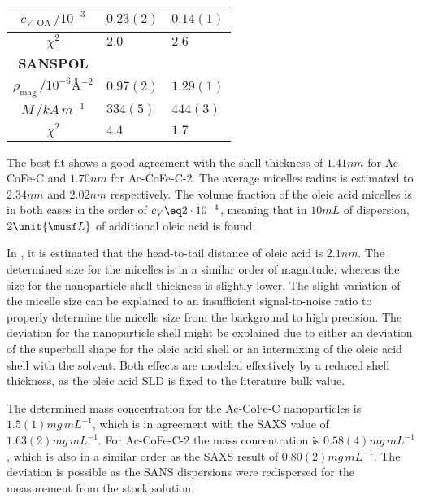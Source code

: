 \documentclass[\main/dresen_thesis.tex]{subfiles}
\begin{document}
\begin{table}[!htbp]
\begin{tabular}{ c | l | l }
        \rule{0pt}{2ex} $c_{V, \, \mathrm{OA}} \, / \unit{10^{-3}}$                  & $0.23(2)$      & $0.14(1)$  \\
        \hline
        \rule{0pt}{2ex} $\chi^2$                                                     & $2.0$          & $2.6$      \\
        \hline
        \textbf{SANSPOL}\\
        \hline
        \rule{0pt}{2ex} $\rho_\mathrm{mag} \, / \unit{10^{-6} \angstrom^{-2}}$       & $0.97(2)$      & $1.29(1)$  \\
        \rule{0pt}{2ex} $M \, / \unit{kA \,m^{-1}}$                                  & $334(5)$       & $444(3)$   \\
        \hline
        \rule{0pt}{2ex} $\chi^2$                                                     & $4.4$          & $1.7$      \\
      \end{tabular}
    \end{table}

    The best fit shows a good agreement with the shell thickness of $1.41 \unit{nm}$ for Ac-CoFe-C and $1.70 \unit{nm}$ for Ac-CoFe-C-2.
    The average micelles radius is estimated to $2.34 \unit{nm}$ and $2.02 \unit{nm}$ respectively.
    The volume fraction of the oleic acid micelles is in both cases in the order of $c_V \eq 2 \cdot 10^{-4}$, meaning that in $10 \unit{mL}$ of dispersion, $2 \unit{\musf L}$ of additional oleic acid is found.

    In \cite{Disch_2010_Thesp}, it is estimated that the head-to-tail distance of oleic acid is $2.1 \unit{nm}$.
    The determined size for the micelles is in a similar order of magnitude, whereas the size for the nanoparticle shell thickness is slightly lower.
    The slight variation of the micelle size can be explained to an insufficient signal-to-noise ratio to properly determine the micelle size from the background to high precision.
    The deviation for the nanoparticle shell might be explained due to either an deviation of the superball shape for the oleic acid shell or an intermixing of the oleic acid shell with the solvent.
    Both effects are modeled effectively by a reduced shell thickness, as the oleic acid SLD is fixed to the literature bulk value.

    The determined mass concentration for the Ac-CoFe-C nanoparticles is $1.5(1) \unit{mg\, mL^{-1}}$, which is in agreement with the SAXS value of $1.63(2) \unit{mg\, mL^{-1}}$.
    For Ac-CoFe-C-2 the mass concentration is $0.58(4) \unit{mg\, mL^{-1}}$, which is also in a similar order as the SAXS result of $0.80(2) \unit{mg \, mL^{-1}}$.
    The deviation is possible as the SANS dispersions were redispersed for the measurement from the stock solution.
\end{document}
